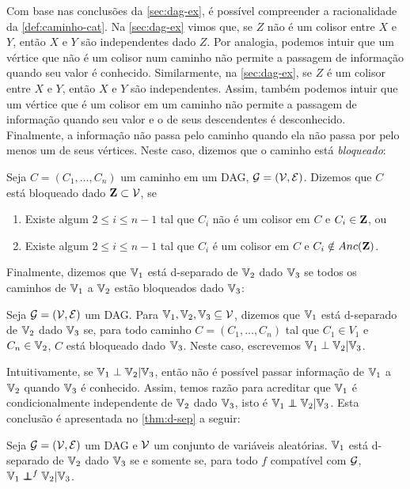 Com base nas conclusões da \cref{sec:dag-ex},
é possível compreender a racionalidade
da \cref{def:caminho-cat}.
Na \cref{sec:dag-ex} vimos que,
se $Z$ não é um colisor entre
$X$ e $Y$, então
$X$ e $Y$ são independentes dado $Z$.
Por analogia, podemos intuir que um vértice que
não é um colisor num caminho
não permite a passagem de informação
quando seu valor é conhecido.
Similarmente, na \cref{sec:dag-ex},
se $Z$ é um colisor entre
$X$ e $Y$, então 
$X$ e $Y$ são independentes.
Assim, também podemos intuir que um vértice que
é um colisor em um caminho não permite
a passagem de informação quando seu valor e
o de seus descendentes é desconhecido.
Finalmente, a informação não passa pelo caminho quando
ela não passa por pelo menos um de seus vértices.
Neste caso, dizemos que o caminho está \textit{bloqueado}:

\begin{definition}
 \label{def:caminho-bloq}
 Seja $C = (C_1,\ldots,C_n)$ um caminho 
 em um DAG, ${\mathcal G} = ({\mathcal V},{\mathcal E})$.
 Dizemos que $C$ está bloqueado dado ${\mathbf{Z}} \subset {\mathcal V}$, se
 \begin{enumerate}
  \item Existe algum $2 \leq i \leq n-1$ tal que
  $C_i$ não é um colisor em $C$ e $C_{i} \in {\mathbf{Z}}$, ou
  \item Existe algum $2 \leq i \leq n-1$ tal que 
  $C_i$ é um colisor em $C$ e $C_{i} \notin Anc({\mathbf{Z}})$.
 \end{enumerate}
\end{definition}

Finalmente, dizemos que ${\mathbb V}_1$ está d-separado de ${\mathbb V}_2$
dado ${\mathbb V}_3$ se todos os caminhos de 
${\mathbb V}_1$ a ${\mathbb V}_2$ estão bloqueados dado ${\mathbb V}_3$:

\begin{definition}
 \label{def:d-sep}
 Seja ${\mathcal G} = ({\mathcal V}, {\mathcal E})$ um DAG. 
 Para ${\mathbb V}_1,{\mathbb V}_2,{\mathbb V}_3 \subseteq {\mathcal V}$, dizemos que
 ${\mathbb V}_1$ está d-separado de ${\mathbb V}_2$ dado ${\mathbb V}_3$ se,
 para todo caminho $C = (C_1,\ldots,C_n)$ tal que
 $C_1 \in V_1$ e $C_n \in {\mathbb V}_2$,
 $C$ está bloqueado dado ${\mathbb V}_3$.
 Neste caso, escrevemos ${\mathbb V}_1 \perp {\mathbb V}_2 | {\mathbb V}_3$.
\end{definition}

Intuitivamente, se ${\mathbb V}_1 \perp {\mathbb V}_2 | {\mathbb V}_3$, então 
não é possível passar informação de ${\mathbb V}_1$ a ${\mathbb V}_2$ quando
${\mathbb V}_3$ é conhecido.
Assim, temos razão para acreditar que
${\mathbb V}_1$ é condicionalmente independente de ${\mathbb V}_2$ dado ${\mathbb V}_3$,
isto é ${\mathbb V}_1 \perp\!\!\!\!\perp {\mathbb V}_2 | {\mathbb V}_3$.
Esta conclusão é apresentada no 
\cref{thm:d-sep} a seguir:

\begin{theorem}
 \label{thm:d-sep}
 Seja ${\mathcal G} = ({\mathcal V}, {\mathcal E})$ um DAG e
 ${\mathcal V}$ um conjunto de variáveis aleatórias.
 ${\mathbb V}_1$ está d-separado de ${\mathbb V}_2$ dado ${\mathbb V}_3$
 se e somente se, para todo $f$ compatível com ${\mathcal G}$,
 ${\mathbb V}_1 \perp\!\!\!\!\perp^f {\mathbb V}_2 | {\mathbb V}_3$.
\end{theorem}


